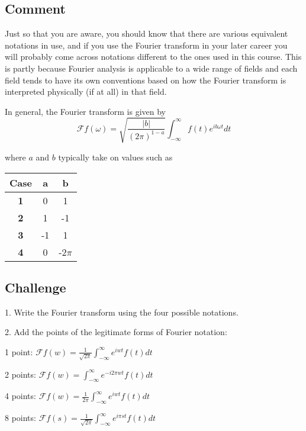 \subsection*{Comment}
Just so that you are aware, you should know that there are various equivalent notations in use, and if you use the Fourier transform in your later career you will probably come across notations different to the ones used in this course. This is partly because Fourier analysis is applicable to a wide range of fields and each field tends to have its own conventions based on how the Fourier transform is interpreted physically (if at all) in that field.

In general, the Fourier transform is given by
\begin{equation}
    \mathcal{F}f(\omega) = \sqrt{\frac{|b|}{(2 \pi)^{1-a}}} \int_{-\infty}^{\infty} f(t) e^{i b \omega t} dt
\end{equation}

where $a$ and $b$ typically take on values such as 

\begin{tabular}{|c|c c|}
    \hline
    \textbf{Case} & \textbf{a} & \textbf{b} \\
    \hline
    \textbf{1}    & 0          & 1          \\
    \textbf{2}    & 1          & -1         \\
    \textbf{3}    & -1         & 1          \\
    \textbf{4}    & 0          & -2$\pi$   \\
    \hline
\end{tabular}

\subsection*{Challenge}
1. Write the Fourier transform using the four possible notations.

2. Add the points of the legitimate forms of Fourier notation:

1 point: $\displaystyle \mathcal{F}f(w)=\frac{1}{\sqrt{2 \pi}} \int_{-\infty}^{\infty} e^{i w t} f(t) dt$

2 points: $\displaystyle \mathcal{F}f(w)=\int_{-\infty}^{\infty} e^{-i 2 \pi w t} f(t) dt$

4 points: $\displaystyle \mathcal{F}f(w)=\frac{1}{2 \pi} \int_{-\infty}^{\infty} e^{i w t} f(t) dt$

8 points: $\displaystyle \mathcal{F}f(s)=\frac{1}{\sqrt{2 \pi}} \int_{-\infty}^{\infty} e^{i \pi s t} f(t) dt$


